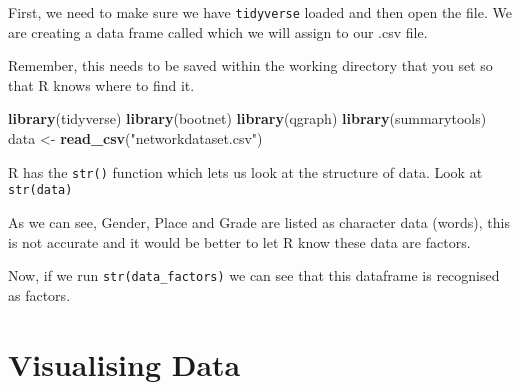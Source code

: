 \documentclass[]{book}
\newenvironment{Shaded}{\begin{snugshade}}{\end{snugshade}}
\newcommand{\DataTypeTok}[1]{\textcolor[rgb]{0.13,0.29,0.53}{#1}}
\newcommand{\KeywordTok}[1]{\textcolor[rgb]{0.13,0.29,0.53}{\textbf{#1}}}
\newcommand{\NormalTok}[1]{#1}
\newcommand{\OperatorTok}[1]{\textcolor[rgb]{0.81,0.36,0.00}{\textbf{#1}}}
\newcommand{\StringTok}[1]{\textcolor[rgb]{0.31,0.60,0.02}{#1}}
\begin{document}
First, we need to make sure we have \texttt{tidyverse} loaded and then open the file. We are creating a data frame called which we will assign to our .csv file.

Remember, this needs to be saved within the working directory that you set so that R knows where to find it.

\begin{Shaded}
\begin{Highlighting}[]
\KeywordTok{library}\NormalTok{(tidyverse)}
\KeywordTok{library}\NormalTok{(bootnet)}
\KeywordTok{library}\NormalTok{(qgraph)}
\KeywordTok{library}\NormalTok{(summarytools)}
\NormalTok{data <-}\StringTok{ }\KeywordTok{read_csv}\NormalTok{(}\StringTok{"networkdataset.csv"}\NormalTok{)}
\end{Highlighting}
\end{Shaded}

R has the \texttt{str()} function which lets us look at the structure of data. Look at \texttt{str(data)}

As we can see, Gender, Place and Grade are listed as character data (words), this is not accurate and it would be better to let R know these data are factors.

\begin{Shaded}
\end{Shaded}

Now, if we run \texttt{str(data\_factors)} we can see that this dataframe is recognised as factors.

\hypertarget{visualising-data}{%
\section{Visualising Data}\label{visualising-data}}
\end{document}
